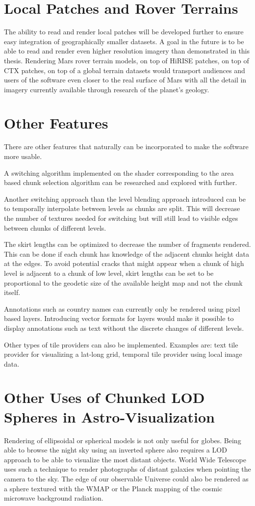\section{Local Patches and Rover Terrains}
The ability to read and render local patches will be developed further to ensure easy integration of geographically smaller datasets. A goal in the future is to be able to read and render even higher resolution imagery than demonstrated in this thesis. Rendering Mars rover terrain models, on top of HiRISE patches, on top of CTX patches, on top of a global terrain datasets would transport audiences and users of the software even closer to the real surface of Mars with all the detail in imagery currently available through research of the planet's geology.

\section{Other Features}
There are other features that naturally can be incorporated to make the software more usable. 

A switching algorithm implemented on the shader corresponding to the area based chunk selection algorithm can be researched and explored with further.

Another switching approach than the level blending approach introduced can be to temporally interpolate between levels as chunks are split. This will decrease the number of textures needed for switching but will still lead to visible edges between chunks of different levels.

The skirt lengths can be optimized to decrease the number of fragments rendered. This can be done if each chunk has knowledge of the adjacent chunks height data at the edges. To avoid potential cracks that might appear when a chunk of high level is adjacent to a chunk of low level, skirt lengths can be set to be proportional to the geodetic size of the available height map and not the chunk itself.

Annotations such as country names can currently only be rendered using pixel based layers. Introducing vector formats for layers would make it possible to display annotations such as text without the discrete changes of different levels.

Other types of tile providers can also be implemented. Examples are: text tile provider for visualizing a lat-long grid, temporal tile provider using local image data.

\section{Other Uses of Chunked LOD Spheres in Astro-Visualization}
Rendering of ellipsoidal or spherical models is not only useful for globes. Being able to browse the night sky using an inverted sphere also requires a LOD approach to be able to visualize the most distant objects. World Wide Telescope uses such a  technique to render photographs of distant galaxies when pointing the camera to the sky. The edge of our observable Universe could also be rendered as a sphere textured with the WMAP or the Planck mapping of the cosmic microwave background radiation.